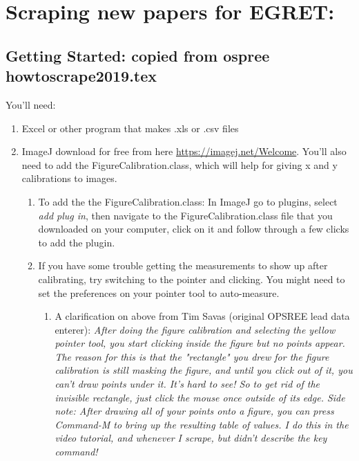 \documentclass{article}[12pt]
\begin{document}
\section*{Scraping new papers for EGRET: }
\subsection*{Getting Started: copied from ospree howtoscrape2019.tex}
You'll need:
\begin{enumerate}
\item Excel or other program that makes .xls  or .csv files
\item ImageJ download for free from here \url{https://imagej.net/Welcome}. You'll also need to add the Figure\textunderscore Calibration.class, which will help for giving x and y calibrations to images. 
\begin{enumerate}
\item To add the the Figure\textunderscore Calibration.class: In ImageJ go to plugins, select \textit{add plug in}, then navigate to the Figure\textunderscore Calibration.class file that you downloaded on your computer, click on it and follow through a few clicks to add the plugin.
\item If you have some trouble getting the measurements to show up after calibrating, try switching to the pointer and clicking. You might need to set the preferences on your pointer tool to auto-measure.
\begin{enumerate}
\item A clarification on above from Tim Savas (original OPSREE lead data enterer): \textit{After doing the figure calibration and selecting the yellow pointer tool, you start clicking inside the figure but no points appear. The reason for this is that the "rectangle" you drew for the figure calibration is still masking the figure, and until you click out of it, you can't draw points under it. It's hard to see! So to get rid of the invisible rectangle, just click the mouse once outside of its edge. Side note: After drawing all of your points onto a figure, you can press Command-M to bring up the resulting table of values. I do this in the video tutorial, and whenever I scrape, but didn't describe the key command!}
\end{enumerate}
\end{enumerate}
\end{enumerate}
\end{document}
